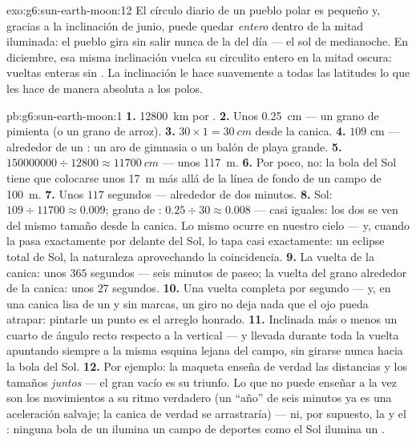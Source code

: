 \begin{solution}{exo:g6:sun-earth-moon:12}
El círculo diario de un pueblo polar es pequeño y, gracias a la
inclinación de junio, puede quedar \emph{entero} dentro de la mitad
iluminada: el pueblo gira sin salir nunca de la  del día --- el sol
de medianoche. En diciembre, esa misma inclinación vuelca su
circulito entero en la mitad oscura: vueltas enteras sin
. La inclinación le hace suavemente a todas las latitudes
lo que les hace de manera absoluta a los polos.
\end{solution}

\begin{solution}{pb:g6:sun-earth-moon:1}
\textbf{1.} \qty{12800}{km} por .
\textbf{2.} Unos \qty{0.25}{cm} --- un grano de pimienta (o un grano
de arroz).
\textbf{3.} $30 \times 1 = \qty{30}{cm}$ desde la canica.
\textbf{4.} $109$ cm --- alrededor de un : un aro de gimnasia
o un balón de playa grande.
\textbf{5.} $150000000 \div 12800 \approx \qty{11700}{cm}$ --- unos
\qty{117}{m}.
\textbf{6.} Por poco, no: la bola del Sol tiene que colocarse unos
\qty{17}{m} más allá de la línea de fondo de un campo de \qty{100}{m}.
\textbf{7.} Unos $117$ segundos --- alrededor de dos minutos.
\textbf{8.} Sol: $109 \div 11700 \approx 0.009$; grano de :
$0.25 \div 30 \approx 0.008$ --- casi iguales: los dos se ven del
mismo tamaño desde la canica. Lo mismo ocurre en nuestro cielo --- y,
cuando la  pasa exactamente por delante del Sol, lo tapa casi
exactamente: un eclipse total de Sol, la naturaleza aprovechando la
coincidencia.
\textbf{9.} La vuelta de la canica: unos $365$ segundos --- seis
minutos de paseo; la vuelta del grano alrededor de la canica: unos
$27$ segundos.
\textbf{10.} Una vuelta completa por segundo --- y, en una canica lisa
de un  y sin marcas, un giro no deja nada que el ojo pueda
atrapar: pintarle un punto es el arreglo honrado.
\textbf{11.} Inclinada más o menos un cuarto de ángulo recto respecto
a la vertical --- y llevada durante toda la vuelta apuntando siempre a
la misma esquina lejana del campo, sin girarse nunca hacia la bola del
Sol.
\textbf{12.} Por ejemplo: la maqueta enseña de verdad las distancias y
los tamaños \emph{juntos} --- el gran vacío es su triunfo. Lo que no
puede enseñar a la vez son los movimientos a su ritmo verdadero (un
``año'' de seis minutos ya es una aceleración salvaje; la canica de
verdad se arrastraría) --- ni, por supuesto, la  y el :
ninguna bola de un  ilumina un campo de deportes como el Sol
ilumina un .
\end{solution}
